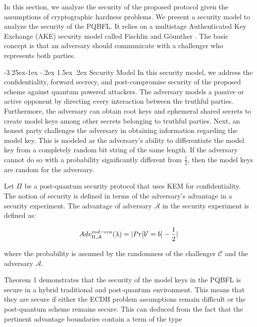 \documentclass[a4paper,fleqn]{cas-dc}
\makeatletter
\renewcommand\subsection{\@startsection{subsection}{2}{\z@}%
   {-3.25ex\@plus -1ex \@minus -.2ex}%
   {1.5ex \@plus .2ex}%
   {\normalfont\large}} %
\makeatother
\begin{document}
In this section, we analyze the security of the proposed protocol given the assumptions of cryptographic hardness problems. 
We present a security model to analyze the security of the PQBFL. 
It relies on a multistage Authenticated Key Exchange (AKE) security model called Fischlin and Göunther \citep{Multi-stage_key_exchange}.
The basic concept is that an adversary should communicate with a challenger who represents both parties. 

\subsection{Security Model} 
In this security model, we address the confidentiality, forward secrecy, and post-compromise security of the proposed scheme against quantum powered attackers. 
The adversary models a passive or active opponent by directing every interaction between the truthful parties. 
Furthermore, the adversary can obtain root keys and ephemeral shared secrets to create model keys among other secrets belonging to truthful parties. 
Next, an honest party challenges the adversary in obtaining information regarding the model key.  This is modeled as the adversary's ability to differentiate the model key from a completely random bit string of the same length.  
If the adversary cannot do so with a probability significantly different from $\frac{1}{2}$, then the model keys are random for the adversary.

Let $\Pi$ be a post-quantum security protocol that uses KEM for confidentiality. 
The notion of security is defined in terms of the adversary’s advantage in a security experiment. 
The advantage of adversary $\mathcal{A}$ in the security experiment is defined as:


\DeclarePairedDelimiter{\abs}{\lvert}{\rvert}
\begin{equation}
    Adv_{\Pi,\mathcal{A}}^{ind-cca}(\lambda)=\abs{Pr[b'=b]-\frac{1}{2}}
\end{equation}

\noindent where the probability is assumed by the randomness of the challenger $\mathcal{C}$ and the adversary $\mathcal{A}$.

Theorem 1 demonstrates that the security of the model keys in the PQBFL is secure in a hybrid traditional and post-quantum environment. 
 This means that they are secure if either the ECDH problem assumptions remain difficult or the post-quantum scheme remains secure. This can deduced from the fact that the pertinent advantage boundaries contain a term of the type 
 
\end{document}
